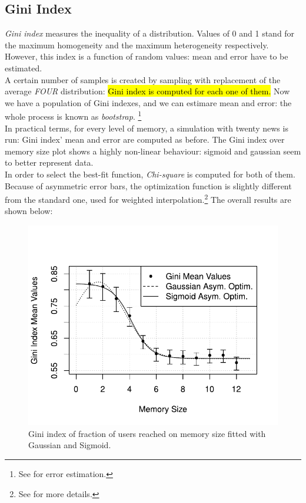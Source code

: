 \subsection{Gini Index}
\textit{Gini index}\cite{ginindex} measures the inequality of a
distribution. Values of 0 and 1 stand for the
maximum homogeneity and the maximum heterogeneity respectively.
However, this index is a function of random values: mean and
error have to be estimated.\\
A certain number of samples is created by sampling with replacement
of the average \textit{FOUR} distribution: \hl{Gini index is
computed for each one of them.}
Now we have a population of Gini indexes, and we can estimare
mean and error: the whole process is known as
\textit{bootstrap}.
\footnote{See  for error estimation.}
\cite{bootstrap}\\
In practical terms, for every level of  memory, a simulation with
twenty news is run: Gini index' mean and error are computed
as before.
The Gini index over memory size plot shows a highly non-linear
behaviour: sigmoid and gaussian seem to better represent data.\\
In order to select the best-fit function, \textit{Chi-square} is
computed for both of them. \\
Because of asymmetric error bars, the optimization function is
slightly different from the standard one, used for weighted
interpolation.\footnote{See  for more details.}
The overall results are shown below:
%
%
\begin{figure}[h]
  \centering
  \includegraphics[trim={0cm 0cm 0cm 1cm},clip,width=.8\columnwidth]{img/gini.pdf}
  \caption[Gini index on memory size]
  {Gini index of fraction of users reached on memory size
    fitted with Gaussian and Sigmoid.
  }
  \label{fig:gini}
\end{figure}
